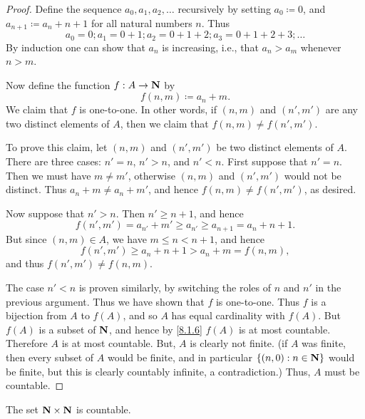 \begin{proof}
  Define the sequence \(a_0, a_1, a_2, \dots\) recursively by setting \(a_0 \coloneqq 0\), and \(a_{n + 1} \coloneqq a_n + n + 1\) for all natural numbers \(n\).
  Thus
  \[
    a_0 = 0; a_1 = 0 + 1; a_2 = 0 + 1 + 2; a_3 = 0 + 1 + 2 + 3; \dots
  \]
  By induction one can show that \(a_n\) is increasing, i.e., that \(a_n > a_m\) whenever \(n > m\).

  Now define the function \(f : A \to \mathbf{N}\) by
  \[
    f(n, m) \coloneqq a_n + m.
  \]
  We claim that \(f\) is one-to-one.
  In other words, if \((n, m)\) and \((n', m')\) are any two distinct elements of \(A\), then we claim that \(f(n, m) \neq f(n', m')\).

  To prove this claim, let \((n, m)\) and \((n', m')\) be two distinct elements of \(A\).
  There are three cases: \(n' = n\), \(n' > n\), and \(n' < n\).
  First suppose that \(n' = n\).
  Then we must have \(m \neq m'\), otherwise \((n, m)\) and \((n', m')\) would not be distinct.
  Thus \(a_n + m \neq a_n + m'\), and hence \(f(n, m) \neq f(n', m')\), as desired.

  Now suppose that \(n' > n\).
  Then \(n' \geq n + 1\), and hence
  \[
    f(n', m') = a_{n'} + m' \geq a_{n'} \geq a_{n + 1} = a_n + n + 1.
  \]
  But since \((n, m) \in A\), we have \(m \leq n < n + 1\), and hence
  \[
    f(n', m') \geq a_n + n + 1 > a_n + m = f(n, m),
  \]
  and thus \(f(n', m') \neq f(n, m)\).

  The case \(n' < n\) is proven similarly, by switching the roles of \(n\) and \(n'\) in the previous argument.
  Thus we have shown that \(f\) is one-to-one.
  Thus \(f\) is a bijection from \(A\) to \(f(A)\), and so \(A\) has equal cardinality with \(f(A)\).
  But \(f(A)\) is a subset of \(\mathbf{N}\), and hence by \cref{8.1.6} \(f(A)\) is at most countable.
  Therefore \(A\) is at most countable.
  But, \(A\) is clearly not finite.
  (if \(A\) was finite, then every subset of \(A\) would be finite, and in particular \(\{(n, 0) : n \in \mathbf{N}\}\) would be finite, but this is clearly countably infinite, a contradiction.)
  Thus, \(A\) must be countable.
\end{proof}

\begin{corollary}\label{8.1.13}
  The set \(\mathbf{N} \times \mathbf{N}\) is countable.
\end{corollary}

